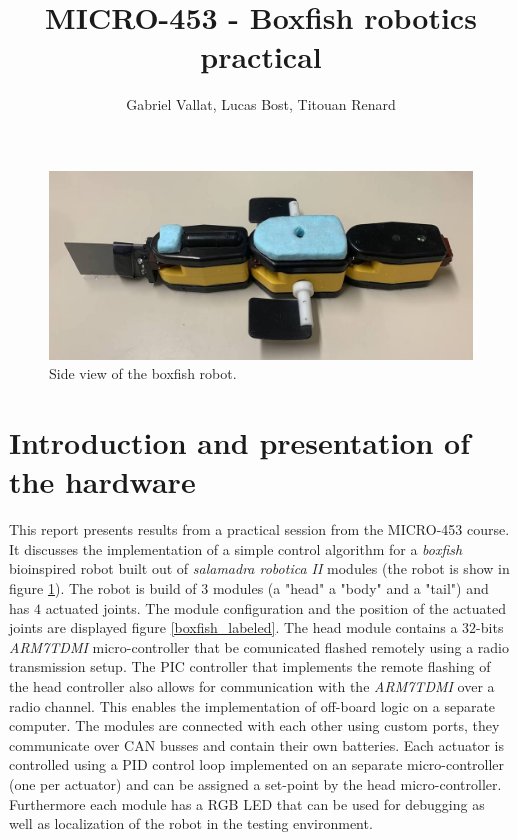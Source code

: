 \documentclass[11pt]{article}
\title{MICRO-453 - Boxfish robotics practical}
\author{Gabriel Vallat, Lucas Bost, Titouan Renard}
\begin{document}
\maketitle
\tableofcontents


\begin{figure}[h!]
    \centering
    \includegraphics[width=\textwidth]{figures/side.jpg}
    \caption{Side view of the boxfish robot.}
    \label{boxfish}
\end{figure}


\section{Introduction and presentation of the hardware}

This report presents results from a practical session from the MICRO-453 course. It discusses the implementation of a simple control algorithm for a \textit{boxfish} bioinspired robot built out of \textit{salamadra robotica II} modules \cite{salamadra_robotica_2} (the robot is show in figure \ref{boxfish}). The robot is build of $3$ modules (a "head" a "body" and a "tail") and has $4$ actuated joints. The module configuration and the position of the actuated joints are displayed figure \ref{boxfish_labeled}. The head module contains a $32$-bits \textit{ARM7TDMI} micro-controller that be comunicated flashed remotely using a radio transmission setup. The PIC controller that implements the remote flashing of the head controller also allows for communication with the \textit{ARM7TDMI} over a radio channel. This enables the implementation of off-board logic on a separate computer. The modules are connected with each other using custom ports, they communicate over CAN busses and contain their own batteries. Each actuator is controlled using a PID control loop implemented on an separate micro-controller (one per actuator) and can be assigned a set-point by the head micro-controller. Furthermore each module has a RGB LED that can be used for debugging as well as localization of the robot in the testing environment.
\end{document}

